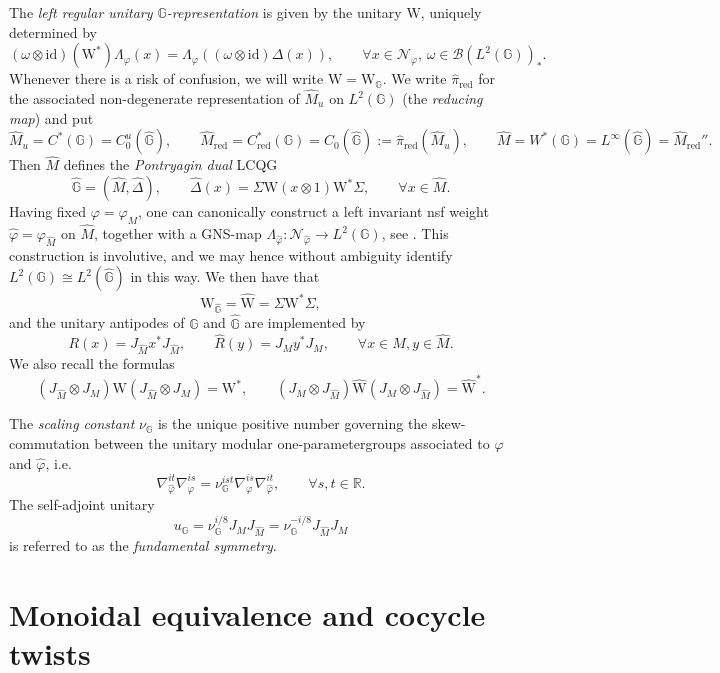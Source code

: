 \documentclass[reqno]{amsart}
\numberwithin{equation}{section}
\newcommand{\R}{\mathbb{R}}
\newcommand{\mcB}{\mathcal{B}}
\newcommand{\id}{\mathrm{id}}
\newcommand{\G}{\mathbb{G}}
\newcommand{\msN}{\mathscr{N}}
\newcommand{\red}{\mathrm{red}}
\newcommand{\vp}{\varphi}
\newcommand{\GG}{\mathbb{G}}
\newcommand{\ww}{\mathrm{W}}
\begin{document}
The \emph{left regular unitary $\G$-representation} is given by the unitary $\ww$, uniquely determined by 
\[
(\omega\otimes \id)(\ww^*)\Lambda_{\vp}(x) = \Lambda_{\vp}((\omega\otimes \id)\Delta(x)),\qquad \forall x\in \msN_{\vp},\, \omega\in \mcB(L^2(\G))_*.
\]
Whenever there is a risk of confusion, we will write $\ww=\ww_{\GG}$. We write $\hat{\pi}_{\red}$ for the associated non-degenerate representation of $\hat{M}_u$ on $L^2(\G)$ (the \emph{reducing map}) and put 
\[
\hat{M}_u = C^*(\G) = C_0^u(\hat{\G}),\qquad \hat{M}_{\red} = C^*_{\red}(\G) = C_0(\hat{\G}) := \hat{\pi}_{\red}(\hat{M}_u),\qquad \hat{M} = W^*(\G) = L^{\infty}(\hat{\G}) = \hat{M}_{\red}''.
\]
Then $\hat{M}$ defines the \emph{Pontryagin dual} LCQG 
\[
\hat{\G} = (\hat{M},\hat{\Delta}),\qquad \hat{\Delta}(x) = \Sigma \ww(x\otimes 1)\ww^*\Sigma,\qquad \forall x\in \hat{M}.
\]
Having fixed $\vp = \vp_{M}$, one can canonically construct a left invariant nsf weight $\hat{\vp}= \vp_{\hat{M}}$ on $\hat{M}$, together with a GNS-map $\Lambda_{\hat{\vp}}\colon \msN_{\hat{\vp}} \rightarrow L^2(\G)$, see \cite{KV03}. This construction is involutive, and we may hence without ambiguity identify $L^2(\G) \cong L^2(\hat{\G})$ in this way. We then have that 
\[
\ww_{\hat{\G}}=\hat{\ww} =\Sigma \ww^*\Sigma,
\]
and the unitary antipodes of $\G$ and $\hat{\G}$ are implemented by 
\begin{equation}\label{EqFormUnitaryAntipo}
R(x) = J_{\hat{M}}x^*J_{\hat{M}},\qquad \hat{R}(y) = J_My^*J_M,\qquad \forall x\in M,y\in \hat{M}.
\end{equation}
We also recall the formulas
\begin{equation}\label{EqModConjMultUn}
(J_{\hat{M}}\otimes J_M)\ww (J_{\hat{M}}\otimes J_M) = \ww^*,\qquad (J_M\otimes J_{\hat{M}})\hat{\ww}(J_{M}\otimes J_{\hat{M}}) = \hat{\ww}^*.
\end{equation}

The \emph{scaling constant} $\nu_{\G}$ is the unique positive number governing the skew-commutation between the unitary modular one-parametergroups associated to $\vp$ and $\hat{\vp}$, i.e.\
\[
\nabla_{\hat{\vp}}^{it}\nabla_{\vp}^{is} = \nu_{\G}^{ist} \nabla_{\vp}^{is}\nabla_{\hat{\vp}}^{it},\qquad \forall s,t\in \R. 
\]
The self-adjoint unitary
\begin{equation}\label{EqFundSymm}
u_{\G} = \nu_{\G}^{i/8}J_MJ_{\hat{M}} = \nu_{\G}^{-i/8}J_{\hat{M}}J_M
\end{equation}
is referred to as the \emph{fundamental symmetry}. 

\section{Monoidal equivalence and cocycle twists}
\end{document}
